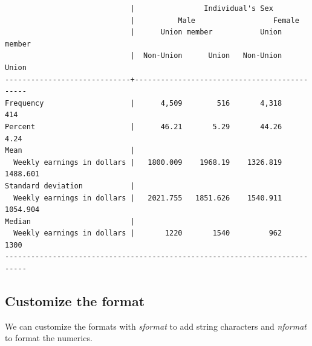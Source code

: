 \documentclass[
]{book}
\newenvironment{Shaded}{\begin{snugshade}}{\end{snugshade}}
\newcommand{\FunctionTok}[1]{\textcolor[rgb]{0.13,0.29,0.53}{\textbf{#1}}}
\newcommand{\KeywordTok}[1]{\textcolor[rgb]{0.13,0.29,0.53}{\textbf{#1}}}
\newcommand{\NormalTok}[1]{#1}
\newcommand{\StringTok}[1]{\textcolor[rgb]{0.31,0.60,0.02}{#1}}
\begin{document}
\begin{verbatim}
                             |                Individual's Sex             
                             |          Male                  Female       
                             |      Union member           Union member    
                             |  Non-Union      Union   Non-Union      Union
-----------------------------+---------------------------------------------
Frequency                    |      4,509        516       4,318        414
Percent                      |      46.21       5.29       44.26       4.24
Mean                         |                                             
  Weekly earnings in dollars |   1800.009    1968.19    1326.819   1488.601
Standard deviation           |                                             
  Weekly earnings in dollars |   2021.755   1851.626    1540.911   1054.904
Median                       |                                             
  Weekly earnings in dollars |       1220       1540         962       1300
---------------------------------------------------------------------------
\end{verbatim}

\subsection{Customize the format}\label{customize-the-format}

We can customize the formats with \emph{sformat} to add string characters and \emph{nformat} to format the numerics.

\begin{Shaded}
\end{Shaded}
\end{document}
